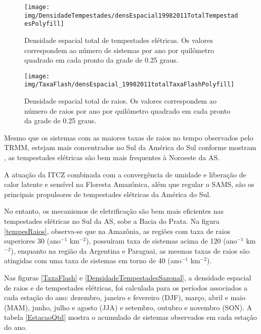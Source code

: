 \begin{figure}[!ht]
 \centering
 {\texttt{[image: img/DensidadeTempestades/densEspacial19982011TotalTempestadesPolyfill]}}
\caption{Densidade espacial total de tempestades elétricas. Os valores correspondem ao número de sistemas por ano por quilômetro quadrado em cada pronto da grade de 0.25 graus.}
 \label{tempestadestotal}
\end{figure}
 
 
\begin{figure}[!ht]
 \centering
  {\texttt{[image: img/TaxaFlash/densEspacial\_19982011totalTaxaFlashPolyfill]}}
  \caption{Densidade espacial total de raios. Os valores correspondem ao número de raios por ano por quilômetro quadrado em cada pronto da grade de 0.25 graus.}
  \label{raiosTotal}
\end{figure}

Mesmo que os sistemas com as maiores taxas de raios no tempo observados pelo TRMM, estejam mais concentrados no Sul da América do Sul conforme mostram , as tempestades elétricas são bem mais frequentes à Noroeste da AS.

A atuação da ITCZ combinada com a convergência de umidade e liberação de calor latente e sensível na Floresta Amazônica, além que regular o SAMS, são os principais propulsores de tempestades elétricas da América do Sul. %

No entanto, os mecanismos de eletrificação são bem mais eficientes nas tempestades elétricas no Sul da AS, sobe a Bacia do Prata. Na figura \ref{tempesRaios}, observa-se que na Amazônia, as regiões com taxa de raios superiores 30 (ano$^{-1}$ km$^{-2}$), possuíram taxa de sistemas acima de 120 (ano$^{-1}$ km$^{-2}$), enquanto na região da Argentina e Paraguai, as mesmas taxas de raios são atingidas com uma taxa de sistemas em torno de 40 (ano$^{-1}$ km$^{-2}$).

Nas figuras \ref{TaxaFlash} e \ref{DensidadeTempestadesSazonal}, a densidade espacial de raios e de tempestades elétricas, foi calculada para os períodos associados a cada estação do ano: dezembro, janeiro e fevereiro (DJF), março, abril e maio (MAM), junho, julho e agosto (JJA) e setembro, outubro e novembro (SON). A tabela \ref{EstacaoQtd} mostra o acumulado de sistemas observados em cada estação do ano.


